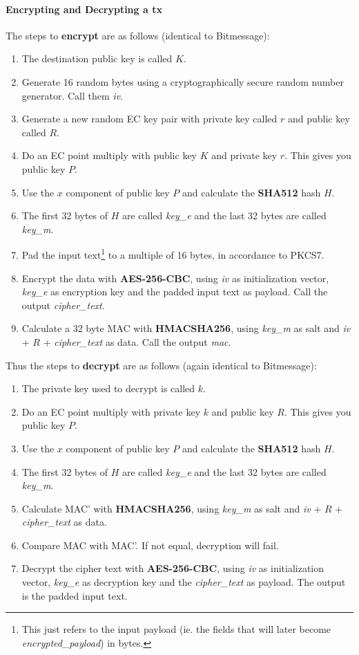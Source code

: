 \documentclass{article}
\begin{document}
\paragraph{Encrypting and Decrypting a tx}
The steps to \textbf{encrypt} are as follows (identical to Bitmessage):
\begin{enumerate}
    \item The destination public key is called $K$.
    \item Generate 16 random bytes using a cryptographically secure random number generator. Call them \textit{iv}.
    \item Generate a new random EC key pair with private key called $r$ and public key called $R$.
    \item Do an EC point multiply with public key $K$ and private key $r$. This gives you public key $P$.
    \item Use the $x$ component of public key $P$ and calculate the \textbf{SHA512} hash $H$.
    \item The first 32 bytes of $H$ are called \textit{key\_e} and the last 32 bytes are called \textit{key\_m}.
    \item Pad the input text\footnote{This just refers to the input payload (ie. the fields that will later become \textit{encrypted\_payload}) in bytes.} to a multiple of 16 bytes, in accordance to PKCS7.
    \item Encrypt the data with \textbf{AES-256-CBC}, using \textit{iv} as initialization vector, \textit{key\_e} as encryption key and the padded input text as payload. Call the output \textit{cipher\_text}.
    \item Calculate a 32 byte MAC with \textbf{HMACSHA256}, using \textit{key\_m} as salt and \textit{iv} + $R$ + \textit{cipher\_text} as data. Call the output \textit{mac}.
\end{enumerate}
Thus the steps to \textbf{decrypt} are as follows (again identical to Bitmessage):
\begin{enumerate}
    \item The private key used to decrypt is called $k$.
    \item Do an EC point multiply with private key $k$ and public key $R$. This gives you public key $P$.
    \item Use the $x$ component of public key $P$ and calculate the \textbf{SHA512} hash $H$.
    \item The first 32 bytes of $H$ are called \textit{key\_e} and the last 32 bytes are called \textit{key\_m}.
    \item Calculate MAC' with \textbf{HMACSHA256}, using \textit{key\_m} as salt and \textit{iv} + $R$ + \textit{cipher\_text} as data.
    \item Compare MAC with MAC'. If not equal, decryption will fail.
    \item Decrypt the cipher text with \textbf{AES-256-CBC}, using \textit{iv} as initialization vector, \textit{key\_e} as decryption key and the \textit{cipher\_text} as payload. The output is the padded input text.
\end{enumerate}
\end{document}
